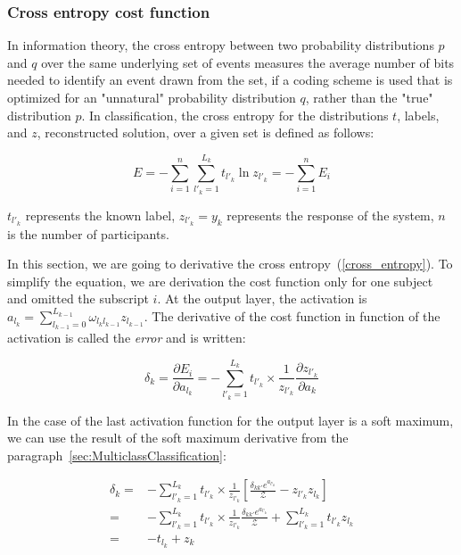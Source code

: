 \documentclass[final, paper=letter,5p,times,twocolumn]{elsarticle}
\begin{document}
\subsubsection{Cross entropy cost function}
\label{Cross_entropy_cost_function_sec}

In information theory, the cross entropy between two probability distributions $p$ and $q$ over the same underlying set of events measures the average number of bits needed to identify an event drawn from the set, if a coding scheme is used that is optimized for an "unnatural" probability distribution $q$, rather than the "true" distribution $p$. In classification, the cross entropy for the distributions $t$, labels, and $z$, reconstructed solution, over a given set is defined as follows:

\begin{equation}
  E = - \sum_{i = 1}^{n}\sum_{l'_{k} = 1}^{L_{k}} t_{l'_{k}} \ln z_{l'_{k}} =  - \sum_{i = 1}^{n} E_{i}
  \label{cross_entropy}
\end{equation}

$t_{l'_{k}}$ represents the known label, $z_{l'_{k}} = y_{k}$ represents the response of the system, $n$ is the number of participants. 

In this section, we are going to derivative the cross entropy~(\ref{cross_entropy}). To simplify the equation, we are derivation the cost function only for one subject and omitted the subscript $i$. At the output layer, the activation is $a_{l_{k}} = \sum_{l_{k-1} = 0}^{L_{k-1}} \omega_{l_{k}l_{k-1}} z_{l_{k-1}}$. The derivative of the cost function in function of the activation is called the {\it error} and is written:

\begin{equation}
  \delta_{k} = \frac{\partial E_{i}}{\partial a_{l_{k}}} = - \sum_{l'_{k} = 1}^{L_{k}} t_{l'_{k}} \times \frac{1}{z_{l'_{k}}} \frac{\partial z_{l'_{k}}}{\partial a_{k}}
  \label{cost_function_error}
\end{equation}

In the case of the last activation function for the output layer is a soft maximum, we can use the result of the soft maximum derivative from the paragraph~\ref{sec:MulticlassClassification}:

\begin{equation*}
  \begin{split}
    \delta_{k} = & - \sum_{l'_{k} = 1}^{L_{k}} t_{l'_{k}} \times \frac{1}{z_{l'_{k}}} \left \lbrack  \frac{\delta_{kk'} e^{a_{l'_{k}}}}{\mathcal{Z}} - z_{l'_{k}}z_{l_{k}} \right \rbrack \\
    = & - \sum_{l'_{k} = 1}^{L_{k}} t_{l'_{k}} \times \frac{1}{z_{l'_{k}}} \frac{\delta_{kk'} e^{a_{l'_{k}}}}{\mathcal{Z}} +  \sum_{l'_{k} = 1}^{L_{k}} t_{l'_{k}} z_{l_{k}} \\
    = & - t_{l_{k}} +  z_{k} \\
  \end{split}
\end{equation*}
\end{document}
